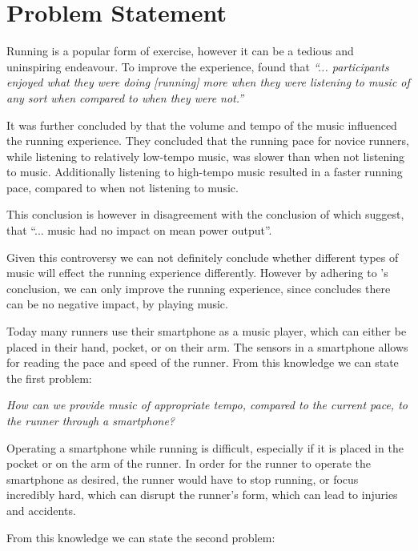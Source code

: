 \section{Problem Statement}
Running is a popular form of exercise, however it can be a tedious and uninspiring endeavour.
To improve the experience, \citet{musicRunEffectArticle} found that 
\textit{``... participants enjoyed what they were doing [running] more when they were listening to music of any sort when compared to when they were not.''}

It was further concluded by \citet{musicRunEffectArticle} that the volume and tempo of the music influenced the running experience.
They concluded that the running pace for novice runners, while listening to relatively low-tempo music, was slower than when not listening to music. Additionally listening to high-tempo music resulted in a faster running pace, compared to when not listening to music.

This conclusion is however in disagreement with the conclusion of \citet{musicNoPerformanceEffect} which suggest, that ``... music had no impact on mean power output''.

Given this controversy we can not definitely conclude whether different types of music will effect the running experience differently. 
However by adhering to \citet{musicRunEffectArticle}'s conclusion, we can only improve the running experience, since \citet{musicNoPerformanceEffect} concludes there can be no negative impact, by playing music.

Today many runners use their smartphone as a music player, which can either be placed in their hand, pocket, or on their arm.
The sensors in a smartphone allows for reading the pace and speed of the runner.
From this knowledge we can state the first problem:

\begin{center}
\textit{How can we provide music of appropriate tempo, compared to the current pace, to the runner through a smartphone?}
\end{center}

Operating a smartphone while running is difficult, especially if it is placed in the pocket or on the arm of the runner.
In order for the runner to operate the smartphone as desired, the runner would have to stop running, or focus incredibly  hard, which can disrupt the runner's form, which can lead to injuries and accidents.

From this knowledge we can state the second problem: 

